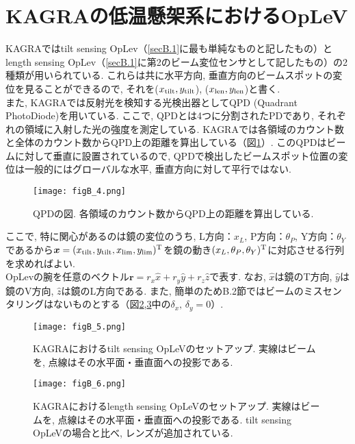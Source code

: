 \section{KAGRAの低温懸架系におけるOpLeV}
KAGRAではtilt sensing OpLev（\ref{secB.1}に最も単純なものと記したもの）とlength sensing OpLev（\ref{secB.1}に第2のビーム変位センサとして記したもの）の2種類が用いられている. これらは共に水平方向, 垂直方向のビームスポットの変位を見ることができるので, それを($x_{\rm tilt},y_{\rm tilt}$), ($x_{\rm len},y_{\rm len}$)と書く. \\
また, KAGRAでは反射光を検知する光検出器としてQPD (Quadrant PhotoDiode)を用いている. ここで, QPDとは4つに分割されたPDであり, それぞれの領域に入射した光の強度を測定している. KAGRAでは各領域のカウント数と全体のカウント数からQPD上の距離を算出している（図\ref{figB.4}）. このQPDはビームに対して垂直に設置されているので, QPDで検出したビームスポット位置の変位は一般的にはグローバルな水平, 垂直方向に対して平行ではない. 
\begin{figure}[H]
\begin{center}
\texttt{[image: figB\_4.png]} 
\caption[QPD]{QPDの図. 各領域のカウント数からQPD上の距離を算出している. }
\label{figB.4}
\end{center}
\end{figure}
ここで, 特に関心があるのは鏡の変位のうち, L方向：$x_L$, P方向：$\theta_P$, Y方向：$\theta_Y$であるから$\bm{x}=(x_{\rm tilt},y_{\rm tilt},x_{\rm lim},y_{\rm lim})^{\rm T}$を鏡の動き$(x_L,\theta_P,\theta_Y)^{\rm T}$に対応させる行列を求めればよい. \\
\quad OpLevの腕を任意のベクトル$\bm{r}=r_x\hat{x}+r_y\hat{y}+r_z\hat{z}$で表す. なお, $\hat{x}$は鏡のT方向, $\hat{y}$は鏡のV方向, $\hat{z}$は鏡のL方向である. また, 簡単のためB.2節ではビームのミスセンタリングはないものとする（図\ref{figB.5},\ref{figB.6}中の$\delta_x,\,\delta_y=0$）. 
\begin{figure}[H]
\begin{center}
\texttt{[image: figB\_5.png]} 
\caption[KAGRAにおけるtilt-sensing OpLeVのセットアップ]{KAGRAにおけるtilt sensing OpLeVのセットアップ. 実線はビームを, 点線はその水平面・垂直面への投影である. }
\label{figB.5}
\end{center}
\end{figure}
\begin{figure}[H]
\begin{center}
\texttt{[image: figB\_6.png]} 
\caption[KAGRAにおけるlength-sensing OpLeVのセットアップ]{KAGRAにおけるlength sensing OpLeVのセットアップ. 実線はビームを, 点線はその水平面・垂直面への投影である. tilt sensing OpLeVの場合と比べ, レンズが追加されている.}
\label{figB.6}
\end{center}
\end{figure}
